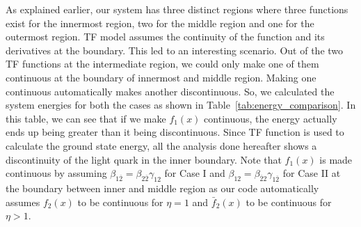 \documentclass[final,3p,times,twocolumn]{elsarticle}
\begin{document}
    As explained earlier, our system has three distinct regions where three functions exist for the innermost region, two for the middle region and one for the outermost region. TF model assumes the continuity of the function and its derivatives at the boundary. This led to an interesting scenario. Out of the two TF functions at the intermediate region, we could only make one of them continuous at the boundary of innermost and middle region. Making one continuous automatically makes another discontinuous. So, we calculated the system energies for both the cases as shown in Table~\eqref{tab:energy_comparison}. In this table, we can see that if we make $f_1(x)$ continuous, the energy actually ends up being greater than it being discontinuous. Since TF function is used to calculate the ground state energy, all the analysis done hereafter shows a discontinuity of the light quark in the inner boundary. Note that $f_{1}(x)$ is made continuous by assuming $\beta_{1\overline{2}} = \beta_{2\overline{2}} \gamma_{12}$ for Case I and  $\beta_{12} = \beta_{\overline{2}2} \gamma_{1\overline{2}}$ for Case II at the boundary between inner and middle region as our code automatically assumes $f_{2}(x)$ to be continuous for $\eta = 1$ and $\bar{f}_{2}(x)$ to be continuous for $\eta > 1$.
    
\end{document}
